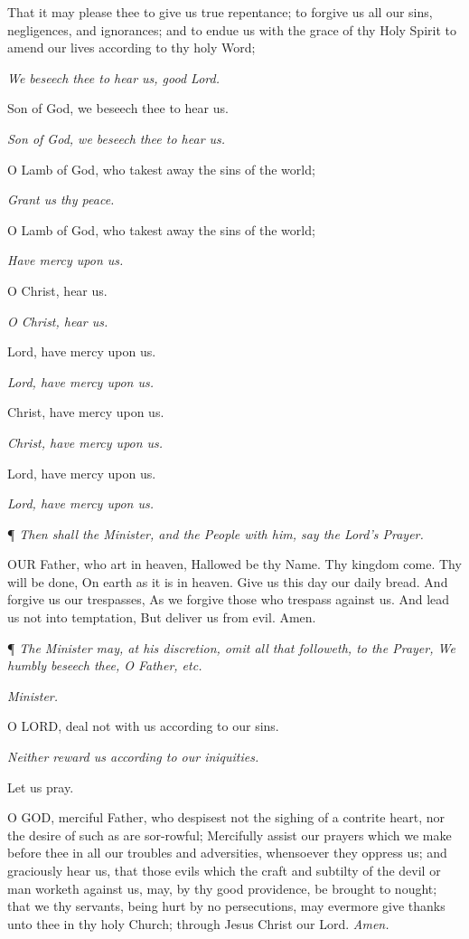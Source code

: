 That it may please thee to give us true repentance;
to forgive us all our sins, negligences, and ignorances; and to endue
us with the grace of thy Holy Spirit to amend our lives according to thy
holy Word; 

\emph{We beseech thee to hear us, good Lord.}

Son of God, we beseech thee to hear us. 

\emph{Son of God, we beseech thee to hear us.}

O Lamb of God, who takest away the sins of the world;

\emph{Grant us thy peace.}

O Lamb of God, who takest away the sins of the world;

\emph{Have mercy upon us.}

O Christ, hear us. 

\emph{O Christ, hear us.}

Lord, have mercy upon us. 

\emph{Lord, have mercy upon us.}

Christ, have mercy upon us. 

\emph{Christ, have mercy upon us.}

Lord, have mercy upon us. 

\emph{Lord, have mercy upon us.}

¶ \emph{Then shall the Minister, and
the People with him, say the Lord's Prayer.}

OUR Father, who art in
heaven, Hallowed be thy Name. Thy kingdom come. Thy will be done, On earth
as it is in heaven. Give us this day our daily bread. And forgive us our
trespasses, As we forgive those who trespass against us. And lead us not
into temptation, But deliver us from evil. Amen.

¶ \emph{The Minister
may, at his discretion, omit all that followeth, to the Prayer, We humbly
beseech thee, O Father, etc.}

\emph{Minister.}

O LORD, deal not with us
according to our sins. 

\emph{Neither reward us according to our iniquities.}

Let us pray.

O GOD, merciful Father,
who despisest not the sighing of a contrite heart, nor the desire of such
as are sor-rowful; Mercifully assist our prayers which we make before
thee in all our troubles and adversities, whensoever they oppress us;
and graciously hear us, that those evils which the craft and subtilty
of the devil or man worketh against us, may, by thy good providence, be
brought to nought; that we thy servants, being hurt by no persecutions,
may evermore give thanks unto thee in thy holy Church; through Jesus Christ
our Lord. \emph{Amen.}

